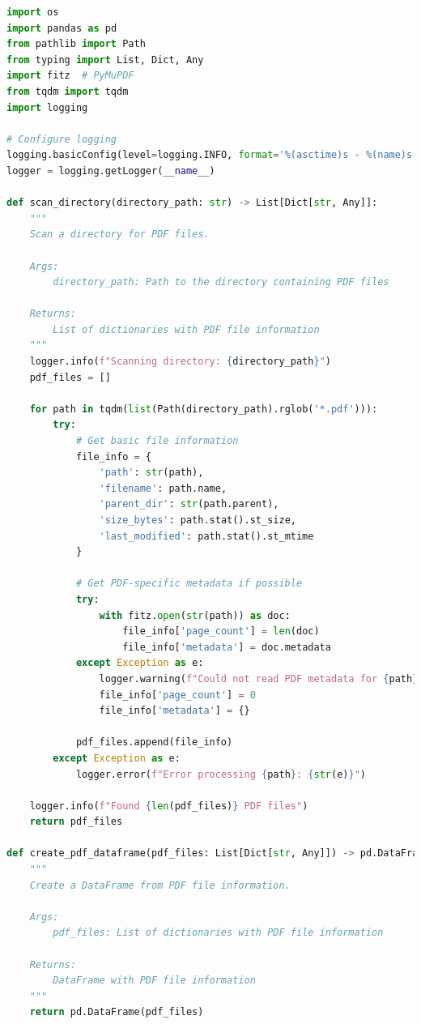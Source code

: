 \documentclass[
  screen,review,acmlarge]{acmart}
\begin{document}
\begin{lstlisting}[language=Python]
import os
import pandas as pd
from pathlib import Path
from typing import List, Dict, Any
import fitz  # PyMuPDF
from tqdm import tqdm
import logging

# Configure logging
logging.basicConfig(level=logging.INFO, format='%(asctime)s - %(name)s - %(levelname)s - %(message)s')
logger = logging.getLogger(__name__)

def scan_directory(directory_path: str) -> List[Dict[str, Any]]:
    """
    Scan a directory for PDF files.
    
    Args:
        directory_path: Path to the directory containing PDF files
        
    Returns:
        List of dictionaries with PDF file information
    """
    logger.info(f"Scanning directory: {directory_path}")
    pdf_files = []
    
    for path in tqdm(list(Path(directory_path).rglob('*.pdf'))):
        try:
            # Get basic file information
            file_info = {
                'path': str(path),
                'filename': path.name,
                'parent_dir': str(path.parent),
                'size_bytes': path.stat().st_size,
                'last_modified': path.stat().st_mtime
            }
            
            # Get PDF-specific metadata if possible
            try:
                with fitz.open(str(path)) as doc:
                    file_info['page_count'] = len(doc)
                    file_info['metadata'] = doc.metadata
            except Exception as e:
                logger.warning(f"Could not read PDF metadata for {path}: {str(e)}")
                file_info['page_count'] = 0
                file_info['metadata'] = {}
                
            pdf_files.append(file_info)
        except Exception as e:
            logger.error(f"Error processing {path}: {str(e)}")
    
    logger.info(f"Found {len(pdf_files)} PDF files")
    return pdf_files

def create_pdf_dataframe(pdf_files: List[Dict[str, Any]]) -> pd.DataFrame:
    """
    Create a DataFrame from PDF file information.
    
    Args:
        pdf_files: List of dictionaries with PDF file information
        
    Returns:
        DataFrame with PDF file information
    """
    return pd.DataFrame(pdf_files)


\end{lstlisting}
\end{document}
